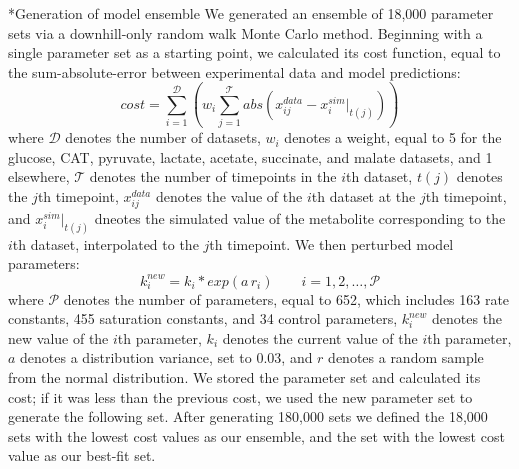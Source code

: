 \documentclass[12pt]{article}
\makeatletter
\renewcommand\subsection{\@startsection
	{subsection}{2}{0mm}
	{-0.05in}
	{-0.5\baselineskip}
	{\normalfont\normalsize\bfseries}}
\makeatother
\begin{document}
\subsection*{Generation of model ensemble}
We generated an ensemble of 18,000 parameter sets via a downhill-only random walk Monte Carlo method.
Beginning with a single parameter set as a starting point, we calculated its cost function, equal to the sum-absolute-error between experimental data and model predictions:
\begin{equation}\label{eqn:cost-function}
    cost=\sum_{i=1}^{\mathcal{D}}\left(w_i\sum_{j=1}^{\mathcal{T}}abs\left(x_{ij}^{data}-x_{i}^{sim}|_{t(j)}\right)\right)
\end{equation}
where $\mathcal{D}$ denotes the number of datasets, $w_i$ denotes a weight, equal to 5 for the glucose, CAT, pyruvate, lactate, acetate, succinate, and malate datasets, and 1 elsewhere, $\mathcal{T}$ denotes the number of timepoints in the $i$th dataset, $t(j)$ denotes the $j$th timepoint, $x_{ij}^{data}$ denotes the value of the $i$th dataset at the $j$th timepoint, and $x_{i}^{sim}|_{t(j)}$ dneotes the simulated value of the metabolite corresponding to the $i$th dataset, interpolated to the $j$th timepoint.
We then perturbed model parameters:
\begin{equation}\label{eqn:parameter-perturbation}
    k_i^{new}=k_i*exp(a\,r_i)\qquad{i=1,2,\hdots,\mathcal{P}}
\end{equation}
where $\mathcal{P}$ denotes the number of parameters, equal to 652, which includes 163 rate constants, 455 saturation constants, and 34 control parameters, $k_i^{new}$ denotes the new value of the $i$th parameter, $k_i$ denotes the current value of the $i$th parameter, $a$ denotes a distribution variance, set to 0.03, and $r$ denotes a random sample from the normal distribution.
We stored the parameter set and calculated its cost; if it was less than the previous cost, we used the new parameter set to generate the following set.
After generating 180,000 sets we defined the 18,000 sets with the lowest cost values as our ensemble, and the set with the lowest cost value as our best-fit set.
\end{document}
